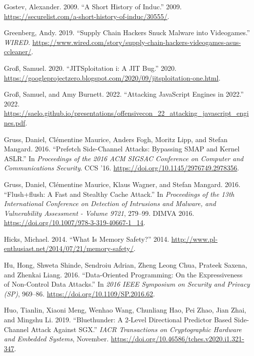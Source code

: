 \documentclass[
  a4paper,
]{report}
\newlength{\cslhangindent}
\newlength{\cslentryspacingunit} %
\newenvironment{CSLReferences}[2] %
 {%
  \setlength{\parindent}{0pt}
  \ifodd #1
  \let\oldpar\par
  \def\par{\hangindent=\cslhangindent\oldpar}
  \fi
  \setlength{\parskip}{#2\cslentryspacingunit}
 }%
 {}
\begin{document}
\begin{CSLReferences}{1}{0}
\leavevmode{}%
Gostev, Alexander. 2009. {``A Short History of Induc.''} 2009.
\url{https://securelist.com/a-short-history-of-induc/30555/}.

\leavevmode{}%
Greenberg, Andy. 2019. {``Supply Chain Hackers Snuck Malware into
Videogames.''} \emph{WIRED}.
\url{https://www.wired.com/story/supply-chain-hackers-videogames-asus-ccleaner/}.

\leavevmode{}%
Groß, Samuel. 2020. {``JITSploitation i: A JIT Bug.''} 2020.
\url{https://googleprojectzero.blogspot.com/2020/09/jitsploitation-one.html}.

\leavevmode{}%
Groß, Samuel, and Amy Burnett. 2022. {``Attacking JavaScript Engines in
2022.''} 2022.
\url{https://saelo.github.io/presentations/offensivecon_22_attacking_javascript_engines.pdf}.

\leavevmode{}%
Gruss, Daniel, Clémentine Maurice, Anders Fogh, Moritz Lipp, and Stefan
Mangard. 2016. {``Prefetch Side-Channel Attacks: Bypassing SMAP and
Kernel ASLR.''} In \emph{Proceedings of the 2016 ACM SIGSAC Conference
on Computer and Communications Security}. CCS '16.
\url{https://doi.org/10.1145/2976749.2978356}.

\leavevmode{}%
Gruss, Daniel, Clémentine Maurice, Klaus Wagner, and Stefan Mangard.
2016. {``Flush+flush: A Fast and Stealthy Cache Attack.''} In
\emph{Proceedings of the 13th International Conference on Detection of
Intrusions and Malware, and Vulnerability Assessment - Volume 9721},
279--99. DIMVA 2016. \url{https://doi.org/10.1007/978-3-319-40667-1_14}.

\leavevmode{}%
Hicks, Michael. 2014. {``What Is Memory Safety?''} 2014.
\url{http://www.pl-enthusiast.net/2014/07/21/memory-safety/}.

\leavevmode{}%
Hu, Hong, Shweta Shinde, Sendroiu Adrian, Zheng Leong Chua, Prateek
Saxena, and Zhenkai Liang. 2016. {``Data-Oriented Programming: On the
Expressiveness of Non-Control Data Attacks.''} In \emph{2016 IEEE
Symposium on Security and Privacy (SP)}, 969--86.
\url{https://doi.org/10.1109/SP.2016.62}.

\leavevmode{}%
Huo, Tianlin, Xiaoni Meng, Wenhao Wang, Chunliang Hao, Pei Zhao, Jian
Zhai, and Mingshu Li. 2019. {``Bluethunder: A 2-Level Directional
Predictor Based Side-Channel Attack Against {SGX}.''} \emph{{IACR}
Transactions on Cryptographic Hardware and Embedded Systems}, November.
\url{https://doi.org/10.46586/tches.v2020.i1.321-347}.


\end{CSLReferences}
\end{document}
